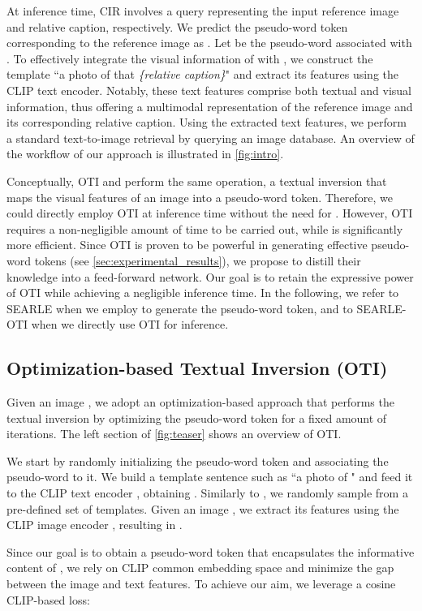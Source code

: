 \documentclass[10pt,twocolumn,letterpaper]{article}
\newcommand{\method}{SEARLE\xspace}
\begin{document}
At inference time, CIR involves a query  representing the input reference image and relative caption, respectively. We predict the pseudo-word token  corresponding to the reference image as . Let  be the pseudo-word associated with . To effectively integrate the visual information of  with , we construct the template ``a photo of  that \textit{\{relative caption\}}" and extract its features using the CLIP text encoder. Notably, these text features comprise both textual and visual information, thus offering a multimodal representation of the reference image and its corresponding relative caption. Using the extracted text features, we perform a standard text-to-image retrieval by querying an image database. An overview of the workflow of our approach is illustrated in \cref{fig:intro}.

Conceptually, OTI and  perform the same operation, \ie a textual inversion that maps the visual features of an image into a pseudo-word token. Therefore, we could directly employ OTI at inference time without the need for . However, OTI requires a non-negligible amount of time to be carried out, while  is significantly more efficient. Since OTI is proven to be powerful in generating effective pseudo-word tokens (see \cref{sec:experimental_results}), we propose to distill their knowledge into a feed-forward network. Our goal is to retain the expressive power of OTI while achieving a negligible inference time. In the following, we refer to \method when we employ  to generate the pseudo-word token, and to \method-OTI when we directly use OTI for inference.  

\subsection{Optimization-based Textual Inversion (OTI)}\label{sec:optimization}
Given an image , we adopt an optimization-based approach that performs the textual inversion by optimizing the pseudo-word token  for a fixed amount of iterations. The left section of \cref{fig:teaser} shows an overview of OTI.

We start by randomly initializing the pseudo-word token  and associating the pseudo-word  to it. We build a template sentence   such as ``a photo of " and feed it to the CLIP text encoder , obtaining . Similarly to \cite{cohen2022this}, we randomly sample  from a pre-defined set of templates. Given an image , we extract its features using the CLIP image encoder , resulting in .

Since our goal is to obtain a pseudo-word token  that encapsulates the informative content of , we rely on CLIP common embedding space and minimize the gap between the image and text features. To achieve our aim, we leverage a cosine CLIP-based loss:
\end{document}
